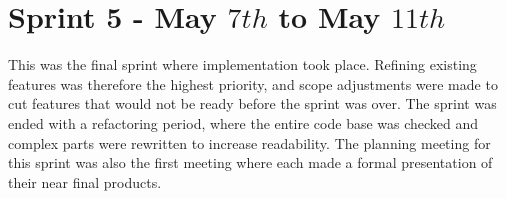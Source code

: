 \section{Sprint 5 - May $7th$ to May $11th$}
This was the final sprint where implementation took place. 
Refining existing features was therefore the highest priority, and scope adjustments were made to cut features that would not be ready before the sprint was over. 
The sprint was ended with a refactoring period, where the entire code base was checked and complex parts were rewritten to increase readability. \newline
The planning meeting for this sprint was also the first meeting where each \localgroup{} made a formal presentation of their near final products.